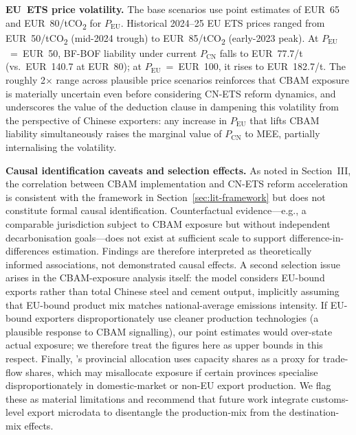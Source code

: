 \documentclass[letterpaper, 10pt, conference]{ieeeconf}
\begin{document}
\textbf{EU~ETS price volatility.} The base scenarios use point
estimates of EUR~65 and EUR~80/tCO\textsubscript{2} for
$P_{\mathrm{EU}}$. Historical 2024--25 EU ETS prices ranged from
EUR~50/tCO\textsubscript{2} (mid-2024 trough) to EUR~85/tCO\textsubscript{2}
(early-2023 peak).
At $P_{\mathrm{EU}}$~=~EUR~50, BF-BOF liability under current
$P_{\mathrm{CN}}$ falls to EUR~77.7/t (vs.\ EUR~140.7 at EUR~80); at
$P_{\mathrm{EU}}$~=~EUR~100, it rises to EUR~182.7/t. The roughly
2$\times$ range across plausible price scenarios reinforces that
CBAM exposure is materially uncertain even before considering CN-ETS
reform dynamics, and underscores the value of the deduction clause in
dampening this volatility from the perspective of Chinese exporters:
any increase in $P_{\mathrm{EU}}$ that lifts CBAM liability
simultaneously raises the marginal value of $P_{\mathrm{CN}}$ to MEE,
partially internalising the volatility.

\textbf{Causal identification caveats and selection effects.} As
noted in Section~III, the correlation between CBAM implementation and
CN-ETS reform acceleration is consistent with the framework in
Section~\ref{sec:lit-framework} but does not constitute formal causal
identification. Counterfactual evidence---e.g., a comparable
jurisdiction subject to CBAM exposure but without independent
decarbonisation goals---does not exist at sufficient scale to support
difference-in-differences estimation. Findings are therefore
interpreted as theoretically informed associations, not demonstrated
causal effects. A second selection issue arises in the CBAM-exposure
analysis itself: the model considers EU-bound exports rather than
total Chinese steel and cement output, implicitly assuming that
EU-bound product mix matches national-average emissions intensity. If
EU-bound exporters disproportionately use cleaner production
technologies (a plausible response to CBAM signalling), our point
estimates would over-state actual exposure; we therefore treat the
figures here as upper bounds in this respect. Finally,
\citeauthor{Pan2025}'s \citeyearpar{Pan2025} provincial allocation
uses capacity shares as a proxy for trade-flow shares, which may
misallocate exposure if certain provinces specialise disproportionately
in domestic-market or non-EU export production. We flag these as
material limitations and recommend that future work integrate
customs-level export microdata to disentangle the production-mix from
the destination-mix effects.

\end{document}
